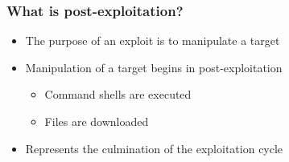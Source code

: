 \documentclass{beamer}
\newenvironment{sitemize}{\vspace{1mm}\begin{itemize}\itemsep 4pt\small}{\end{itemize}}
\begin{document}
%
%

%
%
%
%
%

\begin{frame}[t]
    \frametitle{What is post-exploitation?}

    \begin{sitemize}
        \pause
        \item The purpose of an exploit is to manipulate a target

        \pause
        \item Manipulation of a target begins in post-exploitation
        \begin{sitemize}
            \item Command shells are executed
            \item Files are downloaded
        \end{sitemize}

        \pause
        \item Represents the culmination of the exploitation cycle
    \end{sitemize}
\end{frame}
\end{document}

